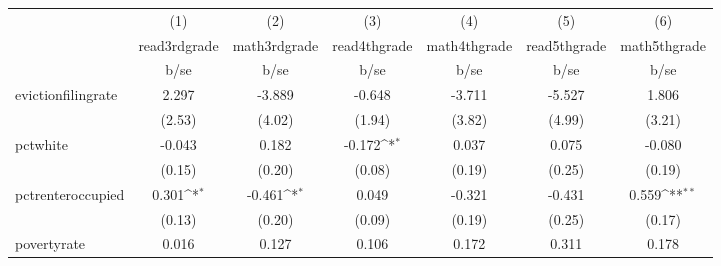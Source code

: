 {
\def\sym#1{\ifmmode^{#1}\else\(^{#1}\)\fi}
\begin{tabular}{l*{6}{c}}
\hline\hline
            &\multicolumn{1}{c}{(1)}           &\multicolumn{1}{c}{(2)}           &\multicolumn{1}{c}{(3)}           &\multicolumn{1}{c}{(4)}           &\multicolumn{1}{c}{(5)}           &\multicolumn{1}{c}{(6)}           \\
            &\multicolumn{1}{c}{read3rdgrade}  &\multicolumn{1}{c}{math3rdgrade}  &\multicolumn{1}{c}{read4thgrade}  &\multicolumn{1}{c}{math4thgrade}  &\multicolumn{1}{c}{read5thgrade}  &\multicolumn{1}{c}{math5thgrade}  \\
            &                     b/se         &                     b/se         &                     b/se         &                     b/se         &                     b/se         &                     b/se         \\
\hline
evictionfilingrate&                    2.297         &                   -3.889         &                   -0.648         &                   -3.711         &                   -5.527         &                    1.806         \\
            &                   (2.53)         &                   (4.02)         &                   (1.94)         &                   (3.82)         &                   (4.99)         &                   (3.21)         \\
pctwhite    &                   -0.043         &                    0.182         &                   -0.172\sym{*}  &                    0.037         &                    0.075         &                   -0.080         \\
            &                   (0.15)         &                   (0.20)         &                   (0.08)         &                   (0.19)         &                   (0.25)         &                   (0.19)         \\
pctrenteroccupied&                    0.301\sym{*}  &                   -0.461\sym{*}  &                    0.049         &                   -0.321         &                   -0.431         &                    0.559\sym{**} \\
            &                   (0.13)         &                   (0.20)         &                   (0.09)         &                   (0.19)         &                   (0.25)         &                   (0.17)         \\
povertyrate &                    0.016         &                    0.127         &                    0.106         &                    0.172         &                    0.311         &                    0.178         \\

\end{tabular}}
